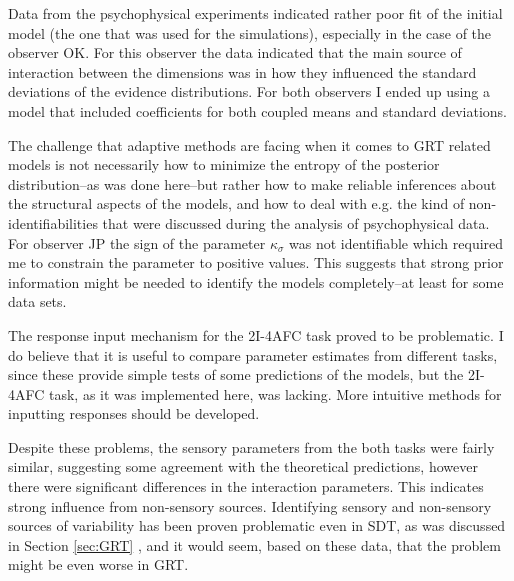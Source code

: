 \documentclass{article}\usepackage{knitr}
\begin{document}
Data from the psychophysical experiments indicated rather poor fit of the initial model (the one that was used for the simulations), especially in the case of the observer OK. For this observer the data indicated that the main source of interaction between the dimensions was in how they influenced the standard deviations of the evidence distributions. For both observers I ended up using a model that included coefficients for both coupled means and standard deviations. 

The challenge that adaptive methods are facing when it comes to GRT related models is not necessarily how to minimize the entropy of the posterior distribution--as was done here--but rather how to make reliable inferences about the structural aspects of the models, and how to deal with e.g. the kind of non-identifiabilities that were discussed during the analysis of psychophysical data. For observer JP the sign of the parameter $\kappa_{\sigma}$ was not identifiable which required me to constrain the parameter to positive values. This suggests that strong prior information might be needed to identify the models completely--at least for some data sets.

The response input mechanism for the 2I-4AFC task proved to be problematic. I do believe that it is useful to compare parameter estimates from different tasks, since these provide  simple tests of  some predictions of the models, but the 2I-4AFC task, as it was implemented  here, was lacking. More intuitive methods for inputting responses should be developed. 

Despite these problems, the sensory parameters from the both tasks were fairly similar, suggesting some agreement with the theoretical predictions, however there were significant differences in the interaction parameters. This indicates strong influence from non-sensory sources. Identifying sensory and non-sensory sources of variability has been proven problematic even in SDT, as was discussed in Section \ref{sec:GRT} \textit{}, and it would seem, based on these data, that the problem might be even worse in GRT. 


\clearpage


\end{document}
